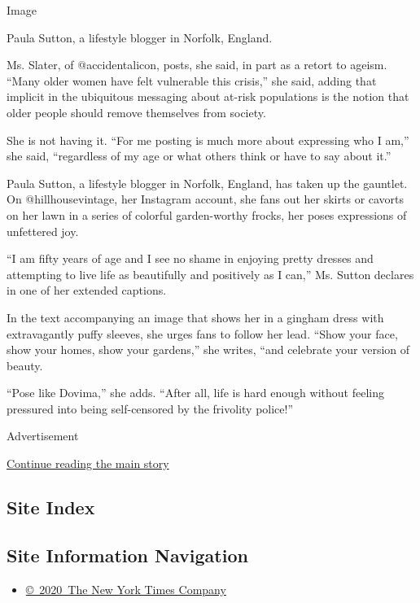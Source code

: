 Image

Paula Sutton, a lifestyle blogger in Norfolk, England.

Ms. Slater, of @accidentalicon, posts, she said, in part as a retort to
ageism. ``Many older women have felt vulnerable this crisis,'' she said,
adding that implicit in the ubiquitous messaging about at-risk
populations is the notion that older people should remove themselves
from society.

She is not having it. ``For me posting is much more about expressing who
I am,'' she said, ``regardless of my age or what others think or have to
say about it.''

Paula Sutton, a lifestyle blogger in Norfolk, England, has taken up the
gauntlet. On @hillhousevintage, her Instagram account, she fans out her
skirts or cavorts on her lawn in a series of colorful garden-worthy
frocks, her poses expressions of unfettered joy.

``I am fifty years of age and I see no shame in enjoying pretty dresses
and attempting to live life as beautifully and positively as I can,''
Ms. Sutton declares in one of her extended captions.

In the text accompanying an image that shows her in a gingham dress with
extravagantly puffy sleeves, she urges fans to follow her lead. ``Show
your face, show your homes, show your gardens,'' she writes, ``and
celebrate your version of beauty.

``Pose like Dovima,'' she adds. ``After all, life is hard enough without
feeling pressured into being self-censored by the frivolity police!''

Advertisement

\protect\hyperlink{after-bottom}{Continue reading the main story}

\hypertarget{site-index}{%
\subsection{Site Index}\label{site-index}}

\hypertarget{site-information-navigation}{%
\subsection{Site Information
Navigation}\label{site-information-navigation}}

\begin{itemize}
\tightlist
\item
  \href{https://help.nytimes3xbfgragh.onion/hc/en-us/articles/115014792127-Copyright-notice}{©~2020~The
  New York Times Company}
\end{itemize}

